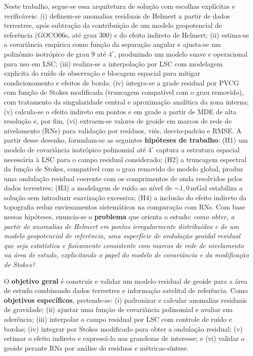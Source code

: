 Neste trabalho, segue-se essa arquitetura de solução com escolhas explícitas e verificáveis: (i) definem-se anomalias residuais de Helmert a partir de dados terrestres, após subtração da contribuição de um modelo geopotencial de referência (GOCO06s, até grau $300$) e do efeito indireto de Helmert; (ii) estima-se a covariância empírica como função da separação angular e ajusta-se um polinômio isotrópico de grau $9$ até $4^\circ$, produzindo um modelo suave e operacional para uso em LSC; (iii) realiza-se a interpolação por LSC com modelagem explícita do ruído de observação e blocagem espacial para mitigar condicionamento e efeitos de borda; (iv) integra-se a grade residual por PVCG com função de Stokes modificada (truncagem compatível com o grau removido), com tratamento da singularidade central e aproximação analítica da zona interna; (v) calcula-se o efeito indireto em pontos e em grade a partir de MDE de alta resolução e, por fim, (vi) extraem-se valores de geoide em marcos de rede de nivelamento (RNs) para validação por resíduos, viés, desvio-padrão e RMSE. A partir desse desenho, formulam-se as seguintes \textbf{hipóteses de trabalho}: (H1) um modelo de covariância isotrópico polinomial até $4^\circ$ captura a estrutura espacial necessária à LSC para o campo residual considerado; (H2) a truncagem espectral da função de Stokes, compatível com o grau removido do modelo global, produz uma ondulação residual coerente com os comprimentos de onda resolvidos pelos dados terrestres; (H3) a modelagem de ruído ao nível de $\sim 1{,}0$\,mGal estabiliza a solução sem introduzir suavização excessiva; (H4) a inclusão do efeito indireto da topografia reduz enviesamentos sistemáticos na comparação com RNs. Com base nessas hipóteses, enuncia-se o \textbf{problema} que orienta o estudo: \emph{como obter, a partir de anomalias de Helmert em pontos irregularmente distribuídos e de um modelo geopotencial de referência, uma superfície de ondulação geoidal residual que seja estatística e fisicamente consistente com marcos de rede de nivelamento na área de estudo, explicitando o papel do modelo de covariância e da modificação de Stokes?}

O \textbf{objetivo geral} é construir e validar um modelo residual de geoide para a área de estudo combinando dados terrestres e informação satelital de referência. Como \textbf{objetivos específicos}, pretende-se: (i) padronizar e calcular anomalias residuais de gravidade; (ii) ajustar uma função de covariância polinomial e avaliar sua aderência; (iii) interpolar o campo residual por LSC com controle de ruído e bordas; (iv) integrar por Stokes modificado para obter a ondulação residual; (v) estimar o efeito indireto e expressá-lo nas grandezas de interesse; e (vi) validar o geoide perante RNs por análise de resíduos e métricas-síntese.

